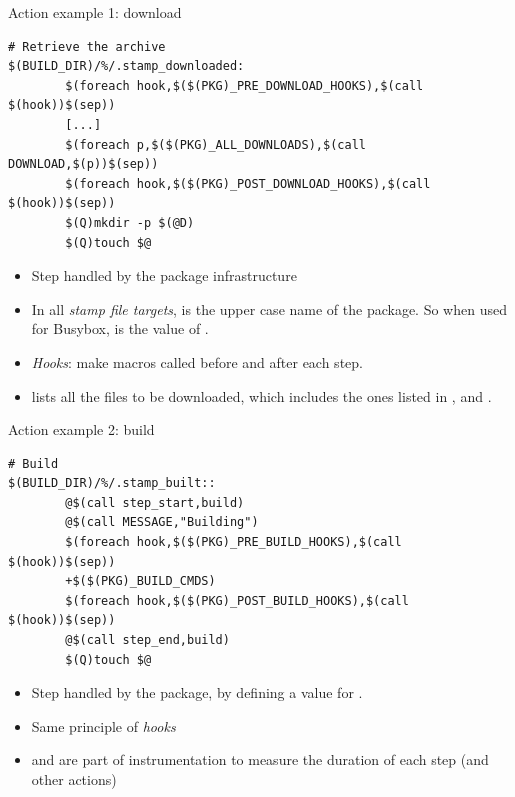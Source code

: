 \begin{frame}[fragile]{Action example 1: download}

\begin{block}{}
\begin{verbatim}
# Retrieve the archive
$(BUILD_DIR)/%/.stamp_downloaded:
        $(foreach hook,$($(PKG)_PRE_DOWNLOAD_HOOKS),$(call $(hook))$(sep))
        [...]
        $(foreach p,$($(PKG)_ALL_DOWNLOADS),$(call DOWNLOAD,$(p))$(sep))
        $(foreach hook,$($(PKG)_POST_DOWNLOAD_HOOKS),$(call $(hook))$(sep))
        $(Q)mkdir -p $(@D)
        $(Q)touch $@
\end{verbatim}
\end{block}

\begin{itemize}
\item Step handled by the package infrastructure
\item In all {\em stamp file targets},  is the upper case
  name of the package. So when used for Busybox,
   is the value of .
\item {\em Hooks}: make macros called before and after each step.
\item {} lists all the files to be downloaded,
  which includes the ones listed in ,
   and .
\end{itemize}

\end{frame}

\begin{frame}[fragile]{Action example 2: build}

\begin{block}{}
\begin{verbatim}
# Build
$(BUILD_DIR)/%/.stamp_built::
        @$(call step_start,build)
        @$(call MESSAGE,"Building")
        $(foreach hook,$($(PKG)_PRE_BUILD_HOOKS),$(call $(hook))$(sep))
        +$($(PKG)_BUILD_CMDS)
        $(foreach hook,$($(PKG)_POST_BUILD_HOOKS),$(call $(hook))$(sep))
        @$(call step_end,build)
        $(Q)touch $@
\end{verbatim}
\end{block}

\begin{itemize}
\item Step handled by the package, by defining a value for
  .
\item Same principle of {\em hooks}
\item {} and  are part of
  instrumentation to measure the duration of each step (and other
  actions)
\end{itemize}

\end{frame}

